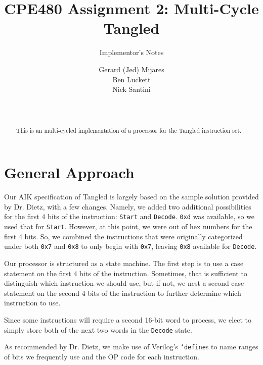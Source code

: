\documentclass{sig-alternate-05-2015}
\begin{document}

\title{CPE480 Assignment 2: Multi-Cycle Tangled }
\subtitle{Implementor's Notes}

\author{
Gerard (Jed) Mijares\\
Ben Luckett\\
Nick Santini\\
       \\
       \\
}

\maketitle
\begin{abstract}
This is an multi-cycled implementation of a processor for the Tangled instruction set. 
\end{abstract}

\section{General Approach}

Our AIK specification of Tangled is largely based on the sample solution provided by Dr. Dietz, with a few changes. Namely, we added two additional possibilities for the first 4 bits of the instruction: \texttt{Start} and \texttt{Decode}. \texttt{0xd} was available, so we used that for \texttt{Start}. However, at this point, we were out of hex numbers for the first 4 bits. So, we combined the instructions that were originally categorized under both \texttt{0x7} and \texttt{0x8} to only begin with \texttt{0x7}, leaving \texttt{0x8} available for \texttt{Decode}.

Our processor is structured as a state machine. The first step is to use a case statement on the first 4 bits of the instruction. Sometimes, that is sufficient to distinguish which instruction we should use, but if not, we nest a second case statement on the second 4 bits of the instruction to further determine which instruction to use.

Since some instructions will require a second 16-bit word to process, we elect to simply store both of the next two words in the \texttt{Decode} state.

As recommended by Dr. Dietz, we make use of Verilog's \texttt{`define}s to name ranges of bits we frequently use and the OP code for each instruction.
\end{document}
